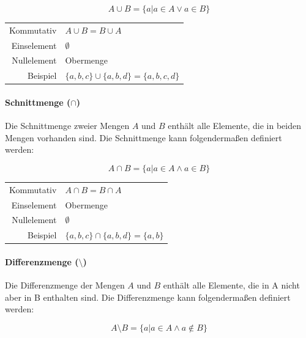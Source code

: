 \documentclass[../main.tex]{subfiles}
\begin{document}
                    \begin{equation}
                        A \cup B = \{a | a \in A \vee a \in B\}
                    \end{equation}
                    
                    \begin{tabular}{ r l }
        	    	    	Kommutativ & $A \cup B = B \cup A$ \\
        	    	    	Einselement & $\emptyset$ \\
        	    	    	Nullelement & Obermenge \\
                        Beispiel & $\{a, b, c\} \cup \{a, b, d\} = \{a, b, c, d\}$
    	    	    \end{tabular}
                    
                \paragraph{Schnittmenge ($\cap$)}
                    Die Schnittmenge zweier Mengen $A$ und $B$ enthält alle Elemente, die in beiden Mengen vorhanden sind. Die Schnittmenge kann folgendermaßen definiert werden:
                    
                    \begin{equation}
                        A \cap B = \{a | a \in A \wedge a \in B\}
                    \end{equation}
                    
                    \begin{tabular}{ r l }
        	    	    	Kommutativ & $A \cap B = B \cap A$ \\
        	    	    	Einselement & Obermenge \\
        	    	    	Nullelement & $\emptyset$ \\
                        Beispiel & $\{a, b, c\} \cap \{a, b, d\} = \{a, b\}$
    	    	    \end{tabular}

                \paragraph{Differenzmenge ($\setminus$)}
                    Die Differenzmenge der Mengen $A$ und $B$ enthält alle Elemente, die in A nicht aber in B enthalten sind. Die Differenzmenge kann folgendermaßen definiert werden:
                    
                    \begin{equation}
                        A \setminus B = \{a | a \in A \wedge a \notin B\}
                    \end{equation}
                    
\end{document}
